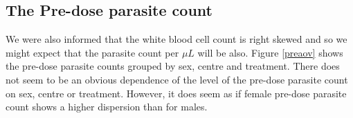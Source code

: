 \subsection{The Pre-dose parasite count}
We were also informed that the white blood cell count is right skewed and so we might expect that the parasite count per $\mu L$ will be also.
Figure \ref{preaov} shows the pre-dose parasite counts grouped by sex, centre and treatment. There does not seem to be an obvious dependence of the level of the pre-dose parasite count on sex, centre or treatment. However, it does seem as if female pre-dose parasite count shows a higher dispersion than for males.

